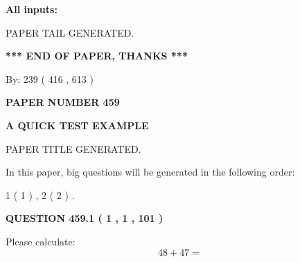 \documentclass[12pt]{article}
\begin{document}
   
\noindent{}
   
   
   
   
\noindent\vspace{0.1in}\hspace{-0.08in} {\textbf{\Large{All inputs: }}}
   
   
   
   
   
   
 \vspace{0.2in}
 
   
   
\vspace{2.0in} PAPER TAIL GENERATED.
   
   
   
   
\vspace{1.0in} 
{\textbf{\large{ *** END OF PAPER, THANKS *** }}} 
   
   
\hspace{1.0in} By: 
 239 ( 416 ,  613 )
   
   
   
   
\newpage 
\setcounter{page}{ 
   459001 } 
   
   
   
   
 {\textbf{ \Large{ PAPER NUMBER  459  }}}
   
   
\vspace{0.2in}
   
   
   
   
   
   
   
   
 \vspace{0.2in}
{\LARGE {\textbf{ A QUICK TEST EXAMPLE}}}
   
   
 PAPER TITLE GENERATED.
   
   
   
\vspace{0.2in}
   
In this paper, big questions will be generated in the following order: 
   
   
   1 ( 1 )
 ,
   2 ( 2 )
 .
  
\vspace{0.2in}
  
{\textbf{\Large{QUESTION
459.1 
 ( 1 , 1 , 101 )
}}}
  
  
 
Please calculate:
\begin{equation}
48 +  %
47 = \nonumber
\end{equation}
 
\end{document}
